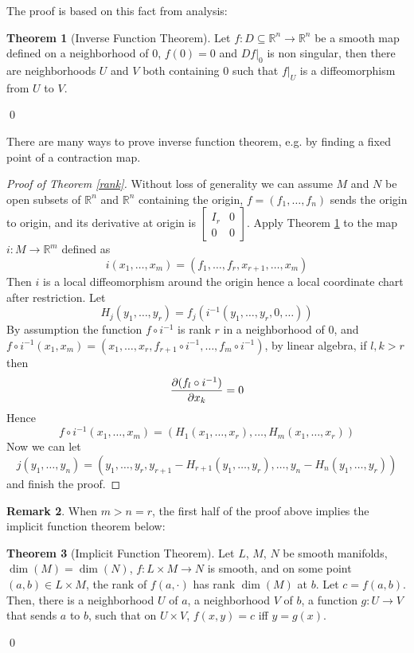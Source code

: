 \documentclass{article}
\theoremstyle{definition}
\newtheorem{thm}{Theorem}[section]
\newtheorem{rmk}[thm]{Remark}
\begin{document}
The proof is based on this fact from analysis:

\begin{thm}[Inverse Function Theorem]\label{inv}
    Let $f: D\subseteq \mathbb{R}^n\rightarrow \mathbb{R}^n$ be a smooth map defined on a neighborhood of $0$, $f(0)=0$ and $Df|_0$ is non singular, then there are neighborhoods $U$ and $V$ both containing $0$ such that $f|_U$ is a diffeomorphism from $U$ to $V$.
\end{thm}\qed

There are many ways to prove inverse function theorem, e.g. by finding a fixed point of a contraction map.\\

\begin{proof}[Proof of Theorem \ref{rank}]
    Without loss of generality we can assume $M$ and $N$ be open subsets of $\mathbb{R}^n$ and $\mathbb{R}^n$ containing the origin, $f=(f_1, \dots, f_n)$ sends the origin to origin, and its derivative at origin is $\left[\begin{array}{cc} I_r & 0\\ 0 & 0\end{array}\right]$. Apply Theorem \ref{inv} to the map $i: M\rightarrow \mathbb{R}^m$ defined as 
    \[i(x_1, \dots, x_m)=(f_1, \dots, f_r, x_{r+1}, \dots, x_m)\]
    Then $i$ is a local diffeomorphism around the origin hence a local coordinate chart after restriction. Let 
    \[H_j(y_1, \dots, y_r)=f_j(i^{-1}(y_1, \dots, y_r, 0, \dots))\]
    By assumption the function $f\circ i^{-1}$ is rank $r$ in a neighborhood of $0$, and $f\circ i^{-1}(x_1, x_m)=(x_1, \dots, x_r, f_{r+1}\circ i^{-1}, \dots, f_m\circ i^{-1})$, by linear algebra, if $l, k>r$ then 
    \[{\partial(f_l\circ i^{-1})\over \partial x_k}=0\]
    Hence 
    \[f\circ i^{-1}(x_1, \dots, x_m)=(H_1(x_1, \dots, x_r), \dots, H_m(x_1, \dots, x_r))\]
    Now we can let 
    \[j(y_1, \dots, y_n)=(y_1, \dots, y_r, y_{r+1}-H_{r+1}(y_1, \dots, y_r), \dots, y_n-H_n(y_1, \dots, y_r))\]
    and finish the proof.
\end{proof}

\begin{rmk}
    When $m>n=r$, the first half of the proof above implies the implicit function theorem below:
\end{rmk}

\begin{thm}[Implicit Function Theorem]\label{implicit}
    Let $L$, $M$, $N$ be smooth manifolds, $\dim(M)=\dim(N)$, $f: L\times M\rightarrow N$
is smooth, and on some point $(a, b)\in L\times M$, the rank of $f(a, \cdot)$ has rank $\dim(M)$ at $b$. Let $c=f(a, b)$. Then, there is a neighborhood $U$ of $a$, a neighborhood $V$ of $b$, a function $g: U\rightarrow V$ that sends $a$ to $b$, such that on $U\times V$, $f(x, y)=c$ iff $y=g(x)$.\end{thm}\qed
\end{document}
